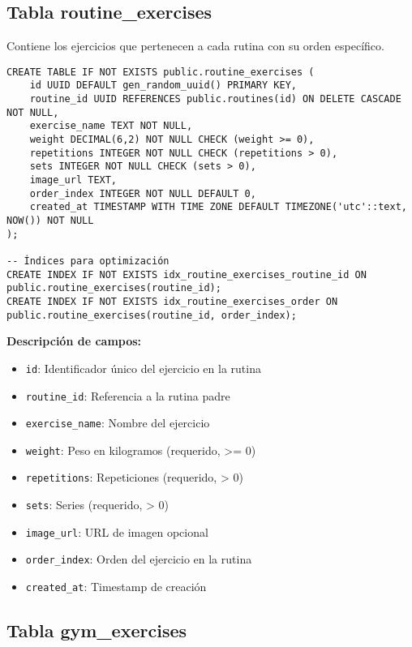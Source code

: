 \documentclass[12pt,a4paper]{article}
\begin{document}
\subsection{Tabla routine\_exercises}

Contiene los ejercicios que pertenecen a cada rutina con su orden específico.

\begin{lstlisting}[style=sqlstyle, caption=Estructura completa de routine_exercises]
CREATE TABLE IF NOT EXISTS public.routine_exercises (
    id UUID DEFAULT gen_random_uuid() PRIMARY KEY,
    routine_id UUID REFERENCES public.routines(id) ON DELETE CASCADE NOT NULL,
    exercise_name TEXT NOT NULL,
    weight DECIMAL(6,2) NOT NULL CHECK (weight >= 0),
    repetitions INTEGER NOT NULL CHECK (repetitions > 0),
    sets INTEGER NOT NULL CHECK (sets > 0),
    image_url TEXT,
    order_index INTEGER NOT NULL DEFAULT 0,
    created_at TIMESTAMP WITH TIME ZONE DEFAULT TIMEZONE('utc'::text, NOW()) NOT NULL
);

-- Índices para optimización
CREATE INDEX IF NOT EXISTS idx_routine_exercises_routine_id ON public.routine_exercises(routine_id);
CREATE INDEX IF NOT EXISTS idx_routine_exercises_order ON public.routine_exercises(routine_id, order_index);
\end{lstlisting}

\textbf{Descripción de campos:}
\begin{itemize}
    \item \texttt{id}: Identificador único del ejercicio en la rutina
    \item \texttt{routine\_id}: Referencia a la rutina padre
    \item \texttt{exercise\_name}: Nombre del ejercicio
    \item \texttt{weight}: Peso en kilogramos (requerido, >= 0)
    \item \texttt{repetitions}: Repeticiones (requerido, > 0)
    \item \texttt{sets}: Series (requerido, > 0)
    \item \texttt{image\_url}: URL de imagen opcional
    \item \texttt{order\_index}: Orden del ejercicio en la rutina
    \item \texttt{created\_at}: Timestamp de creación
\end{itemize}

\subsection{Tabla gym\_exercises}
\end{document}
